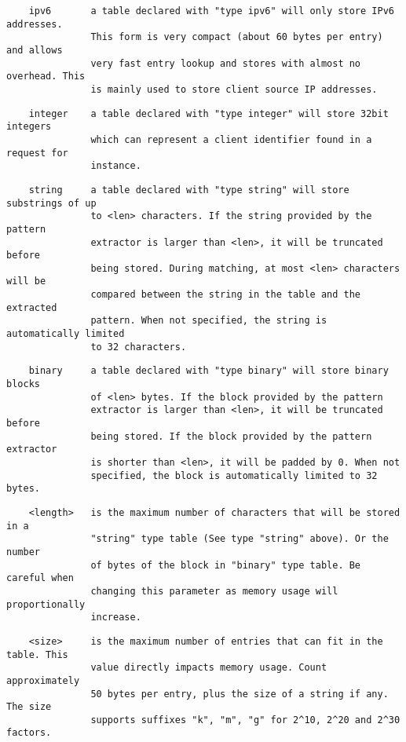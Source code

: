 \begin{verbatim}
    ipv6       a table declared with "type ipv6" will only store IPv6 addresses.
               This form is very compact (about 60 bytes per entry) and allows
               very fast entry lookup and stores with almost no overhead. This
               is mainly used to store client source IP addresses.
\end{verbatim}

\begin{verbatim}
    integer    a table declared with "type integer" will store 32bit integers
               which can represent a client identifier found in a request for
               instance.
\end{verbatim}

\begin{verbatim}
    string     a table declared with "type string" will store substrings of up
               to <len> characters. If the string provided by the pattern
               extractor is larger than <len>, it will be truncated before
               being stored. During matching, at most <len> characters will be
               compared between the string in the table and the extracted
               pattern. When not specified, the string is automatically limited
               to 32 characters.
\end{verbatim}

\begin{verbatim}
    binary     a table declared with "type binary" will store binary blocks
               of <len> bytes. If the block provided by the pattern
               extractor is larger than <len>, it will be truncated before
               being stored. If the block provided by the pattern extractor
               is shorter than <len>, it will be padded by 0. When not
               specified, the block is automatically limited to 32 bytes.
\end{verbatim}

\begin{verbatim}
    <length>   is the maximum number of characters that will be stored in a
               "string" type table (See type "string" above). Or the number
               of bytes of the block in "binary" type table. Be careful when
               changing this parameter as memory usage will proportionally
               increase.
\end{verbatim}

\begin{verbatim}
    <size>     is the maximum number of entries that can fit in the table. This
               value directly impacts memory usage. Count approximately
               50 bytes per entry, plus the size of a string if any. The size
               supports suffixes "k", "m", "g" for 2^10, 2^20 and 2^30 factors.
\end{verbatim}

